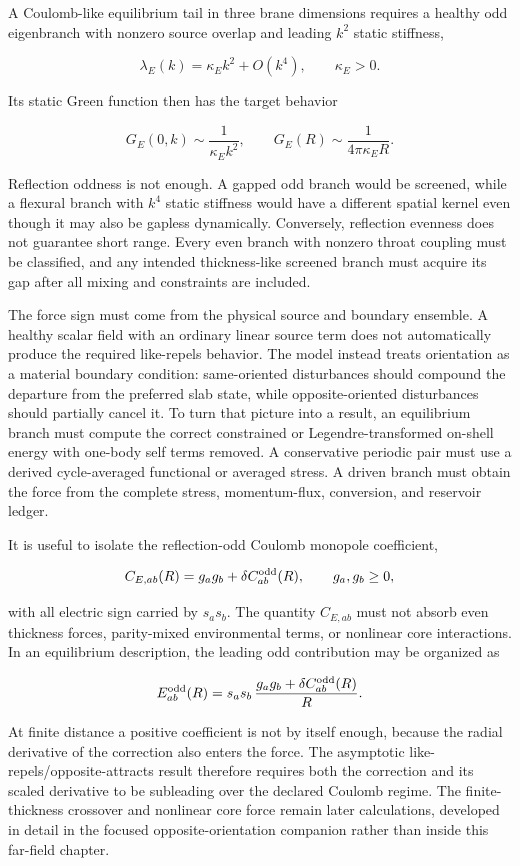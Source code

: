 A Coulomb-like equilibrium tail in three brane dimensions requires a healthy
odd eigenbranch with nonzero source overlap and leading \(k^2\) static
stiffness,

\[
\lambda_E(k)
=
\kappa_E k^2+O(k^4),
\qquad
\kappa_E>0.
\]

Its static Green function then has the target behavior

\[
G_E(0,k)
\sim
\frac{1}{\kappa_E k^2},
\qquad
G_E(R)
\sim
\frac{1}{4\pi\kappa_E R}.
\]

Reflection oddness is not enough. A gapped odd branch would be screened, while
a flexural branch with \(k^4\) static stiffness would have a different spatial
kernel even though it may also be gapless dynamically. Conversely, reflection
evenness does not guarantee short range. Every even branch with nonzero throat
coupling must be classified, and any intended thickness-like screened branch
must acquire its gap after all mixing and constraints are included.

The force sign must come from the physical source and boundary ensemble. A
healthy scalar field with an ordinary linear source term does not automatically
produce the required like-repels behavior. The model instead treats orientation
as a material boundary condition: same-oriented disturbances should compound
the departure from the preferred slab state, while opposite-oriented
disturbances should partially cancel it. To turn that picture into a result, an
equilibrium branch must compute the correct constrained or Legendre-transformed
on-shell energy with one-body self terms removed. A conservative periodic pair
must use a derived cycle-averaged functional or averaged stress. A driven branch
must obtain the force from the complete stress, momentum-flux, conversion, and
reservoir ledger.

It is useful to isolate the reflection-odd Coulomb monopole coefficient,

\[
C_{E,ab}(R)
=
g_a g_b+\delta C_{ab}^{\rm odd}(R),
\qquad
g_a,g_b\ge0,
\]

with all electric sign carried by \(s_a s_b\). The quantity
\(C_{E,ab}\) must not absorb even thickness forces, parity-mixed environmental
terms, or nonlinear core interactions. In an equilibrium description, the
leading odd contribution may be organized as

\[
E_{ab}^{\rm odd}(R)
=
 s_a s_b\,
\frac{g_a g_b+\delta C_{ab}^{\rm odd}(R)}{R}.
\]

At finite distance a positive coefficient is not by itself enough, because the
radial derivative of the correction also enters the force. The asymptotic
like-repels/opposite-attracts result therefore requires both the correction and
its scaled derivative to be subleading over the declared Coulomb regime. The
finite-thickness crossover and nonlinear core force remain later calculations,
developed in detail in the focused opposite-orientation companion rather than
inside this far-field chapter.

